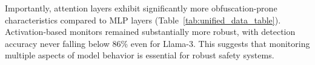 Importantly, attention layers exhibit significantly more obfuscation-prone characteristics compared to MLP layers (Table~\ref{tab:unified_data_table}). Activation-based monitors remained substantially more robust, with detection accuracy never falling below 86\% even for Llama-3. This suggests that monitoring multiple aspects of model behavior is essential for robust safety systems.





